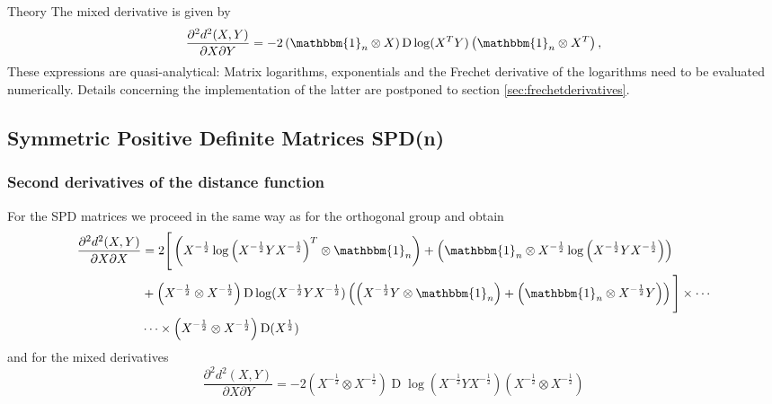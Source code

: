 \begin{chapter}{Theory}
The mixed derivative is given by
\begin{equation}
    \label{eq:son_xy_der}
    \frac{\partial^2 d^2(X,Y)}{\partial X\partial Y} = -2\left(\mathbbm{1}_n\otimes X \right)\operatorname{D}\log(X^TY) \left(\mathbbm{1}_n\otimes X^T \right),
\end{equation}
These expressions are quasi-analytical: Matrix logarithms, exponentials and the Frechet derivative of the logarithms need to be evaluated numerically. Details concerning the 
implementation of the latter are postponed to section \ref{sec:frechetderivatives}.




\subsection{Symmetric Positive Definite Matrices SPD(n)} %
\label{sub:SPD(N)}

\subsubsection{Second derivatives of the distance function} %
\label{ssub:Second derivatives of the distance function}
For the SPD matrices we proceed in the same way as for the orthogonal group and obtain
\begin{align}
    \label{eq:spd_xx_der}
    \frac{\partial^2 d^2(X,Y)}{\partial X\partial X} &= 
    2\Bigg[
	\left(X^{-\frac{1}{2}}\log\left(X^{-\frac{1}{2}}YX^{-\frac{1}{2}}\right)^T\otimes\mathbbm{1}_n\right)
	+\left(\mathbbm{1}_n\otimes X^{-\frac{1}{2}}\log\left(X^{-\frac{1}{2}}YX^{-\frac{1}{2}}\right)\right) \\
    &	+\left(X^{-\frac{1}{2}}\otimes X^{-\frac{1}{2}}\right)\operatorname{D}\log(X^{-\frac{1}{2}}YX^{-\frac{1}{2}})\left( \left(X^{-\frac{1}{2}}Y\otimes\mathbbm{1}_n\right)
	+ \left(\mathbbm{1}_n\otimes X^{-\frac{1}{2}}Y\right)\right) 
    \Bigg] \times\cdots \nonumber \\
    & \cdots\times\left(X^{-\frac{1}{2}}\otimes X^{-\frac{1}{2}}\right)\operatorname{D}(X^{\frac{1}{2}})\nonumber
\end{align}
and for the mixed derivatives
\begin{equation}
    \label{eq:spd_xy_der}
    \frac{\partial^2 d^2(X,Y)}{\partial X\partial Y} = -2\left(X^{-\frac{1}{2}}\otimes X^{-\frac{1}{2}}\right)\operatorname{D}\log\left(X^{-\frac{1}{2}}Y X^{-\frac{1}{2}}\right)\left(X^{-\frac{1}{2}}\otimes X^{-\frac{1}{2}}\right)
\end{equation}


\end{chapter}
